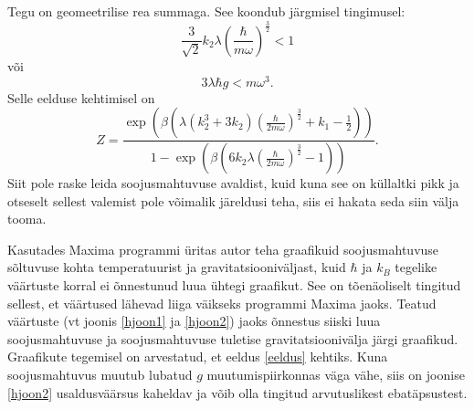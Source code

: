 \documentclass{trkut}%
\begin{document}
Tegu on geomeetrilise rea summaga. See koondub järgmisel tingimusel:
\begin{equation}
    \frac{3}{\sqrt{2}}k_2\lambda \left(\frac{\hbar}{m\omega}\right)^{\frac{3}{2}}<1
\end{equation}
või
\begin{equation} \label{eeldus}
    3 \lambda \hbar g < m \omega^3.
\end{equation}
Selle eelduse kehtimisel on
\begin{equation}
    Z=\frac{\exp\left( \beta \left(  \lambda (k_2^3+3k_2)\left(\frac{\hbar}{2m\omega}\right)^{\frac{3}{2}} +k_1 -\frac{1}{2}\right)\right)}{1-\exp \left( \beta\left( 6 k_2 \lambda \left( \frac{\hbar}{2m\omega}\right)^{\frac{3}{2}} - 1 \right)\right)}.
\end{equation}
Siit pole raske leida soojusmahtuvuse avaldist, kuid kuna see on küllaltki pikk ja otseselt sellest valemist pole võimalik järeldusi teha, siis ei hakata seda siin välja tooma.

Kasutades Maxima programmi üritas autor teha graafikuid soojusmahtuvuse sõltuvuse kohta temperatuurist ja gravitatsiooniväljast, kuid $\hbar$ ja $k_B$ tegelike väärtuste korral ei õnnestunud luua ühtegi graafikut.
See on tõenäoliselt tingitud sellest, et väärtused lähevad liiga väikseks programmi Maxima jaoks.
Teatud väärtuste (vt joonis \ref{hjoon1} ja \ref{hjoon2}) jaoks õnnestus siiski luua soojusmahtuvuse ja soojusmahtuvuse tuletise gravitatsioonivälja järgi graafikud.
Graafikute tegemisel on arvestatud, et eeldus \eqref{eeldus} kehtiks.
Kuna soojusmahtuvus muutub lubatud $g$ muutumispiirkonnas väga vähe, siis on joonise \ref{hjoon2} usaldusväärsus kaheldav ja võib olla tingitud arvutuslikest ebatäpsustest.
\end{document}
